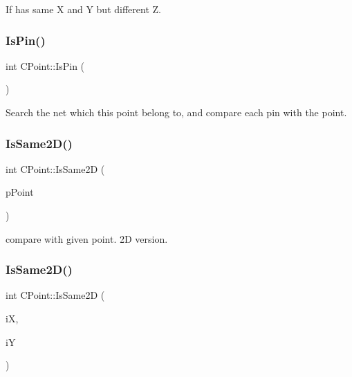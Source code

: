 If has same X and Y but different Z. 

\mbox{\label{classCPoint_a280126da62c6a79238c2511639d58786}} 
\subsubsection{\texorpdfstring{IsPin()}{IsPin()}}
{\footnotesize\ttfamily int C\+Point\+::\+Is\+Pin (\begin{DoxyParamCaption}{ }\end{DoxyParamCaption})}

Search the net which this point belong to, and compare each pin with the point. \mbox{\label{classCPoint_a723515e5fe780b2bc7c4357f210ff6ac}} 
\subsubsection{\texorpdfstring{IsSame2D()}{IsSame2D()}\hspace{0.1cm}{\footnotesize\ttfamily [1/2]}}
{\footnotesize\ttfamily int C\+Point\+::\+Is\+Same2D (\begin{DoxyParamCaption}\item[{\mbox{\hyperlink{classCPoint}{C\+Point}} $\ast$}]{p\+Point }\end{DoxyParamCaption})}



compare with given point. 2D version. 

\mbox{\label{classCPoint_a42c0cc1723520246e543073a13a2c45a}} 
\subsubsection{\texorpdfstring{IsSame2D()}{IsSame2D()}\hspace{0.1cm}{\footnotesize\ttfamily [2/2]}}
{\footnotesize\ttfamily int C\+Point\+::\+Is\+Same2D (\begin{DoxyParamCaption}\item[{int}]{iX,  }\item[{int}]{iY }\end{DoxyParamCaption})}



